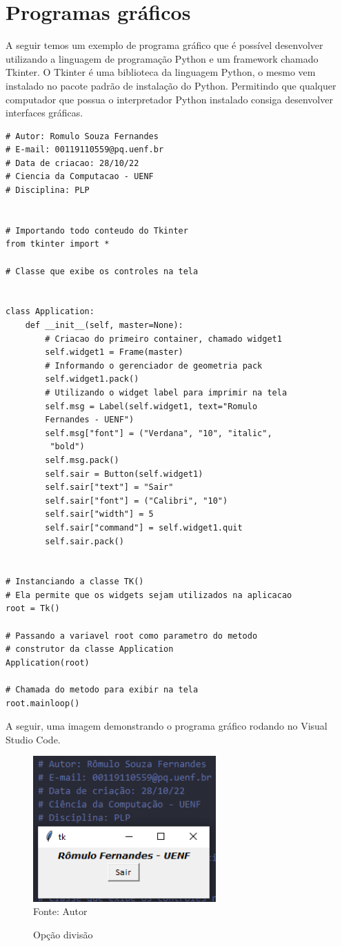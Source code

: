     \section{Programas gráficos}
     A seguir temos um exemplo de programa gráfico que é possível desenvolver utilizando a linguagem de programação Python e um framework chamado Tkinter. O Tkinter é uma biblioteca da linguagem Python, o mesmo vem instalado no pacote padrão de instalação do Python. Permitindo que qualquer computador que possua o interpretador Python instalado consiga desenvolver interfaces gráficas.
	\begin{lstlisting}
# Autor: Romulo Souza Fernandes
# E-mail: 00119110559@pq.uenf.br
# Data de criacao: 28/10/22
# Ciencia da Computacao - UENF
# Disciplina: PLP


# Importando todo conteudo do Tkinter
from tkinter import *

# Classe que exibe os controles na tela


class Application:
	def __init__(self, master=None):
		# Criacao do primeiro container, chamado widget1
		self.widget1 = Frame(master)
		# Informando o gerenciador de geometria pack
		self.widget1.pack()
		# Utilizando o widget label para imprimir na tela
		self.msg = Label(self.widget1, text="Romulo 
		Fernandes - UENF")
		self.msg["font"] = ("Verdana", "10", "italic",
		 "bold")
		self.msg.pack()
		self.sair = Button(self.widget1)
		self.sair["text"] = "Sair"
		self.sair["font"] = ("Calibri", "10")
		self.sair["width"] = 5
		self.sair["command"] = self.widget1.quit
		self.sair.pack()


# Instanciando a classe TK()
# Ela permite que os widgets sejam utilizados na aplicacao
root = Tk()

# Passando a variavel root como parametro do metodo
# construtor da classe Application
Application(root)

# Chamada do metodo para exibir na tela
root.mainloop()
	\end{lstlisting}
	A seguir, uma imagem demonstrando o programa gráfico rodando no Visual Studio Code.
	
	\begin{figure}[H]
		\begin{center}
			\caption{Opção divisão} \label{ling1}
			\includegraphics[width=7cm]{grafico.PNG} \\
			{\tiny \sf Fonte:{ Autor}}
		\end{center}
	\end{figure}

